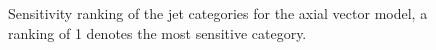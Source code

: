 \begin{figure}[h!] \centering
  \caption{Sensitivity ranking of the jet categories for the axial vector model, a ranking of 1 denotes the most sensitive category. }
  \label{fig:sensitivityAV} 
\end{figure}

